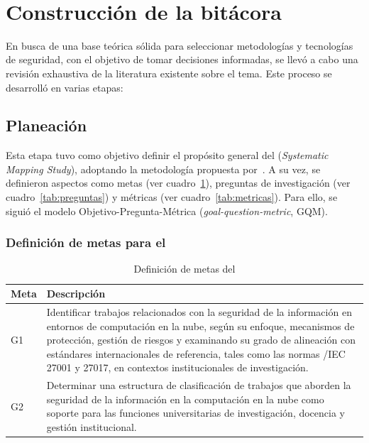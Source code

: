 \label{cap:revisionLiteratura}
\mbox{}\\
\section{Construcción de la bitácora}

En busca de una base teórica sólida para seleccionar metodologías y tecnologías de seguridad, con el objetivo de tomar decisiones 
informadas, se llevó a cabo una revisión exhaustiva de la literatura existente sobre el tema. Este proceso se desarrolló en varias 
etapas:


\subsection{Planeación}

Esta etapa tuvo como objetivo definir el propósito general del \SMS (\textit{Systematic Mapping Study}), adoptando la metodología 
propuesta por~\cite{Sepulveda2021}. A su vez, se definieron aspectos como metas (ver cuadro~\ref{tab:metas}), preguntas de 
investigación (ver cuadro~\ref{tab:preguntas}) y métricas (ver cuadro~\ref{tab:metricas}). Para ello, se siguió el modelo
Objetivo-Pregunta-Métrica (\textit{goal-question-metric}, GQM).

\subsubsection{Definición de metas para el \SMS}

\begin{table}[H]
	\centering
	\renewcommand{\arraystretch}{1.2} %
	\fontsize{9pt}{10pt}\selectfont %
	\begin{tabular}{|p{1.5cm}|p{12.5cm}|}  %
		\hline
		\textbf{Meta} & \textbf{Descripción}   \\
		\hline
		 G1 & Identificar trabajos relacionados con la seguridad de la información en entornos de computación en la nube, según su enfoque, mecanismos de protección, gestión de riesgos y examinando su grado de alineación con estándares internacionales de referencia, tales como las normas \ISO/IEC 27001 y 27017, en contextos institucionales de investigación. \\
        \hline
        G2 & Determinar una estructura de clasificación de trabajos que aborden la seguridad de la información en la computación en la nube como soporte para las funciones universitarias de investigación, docencia y gestión institucional. \\
    \hline    
	\end{tabular}
	\caption{Definición de metas del \SMS}\label{tab:metas}
\end{table}


